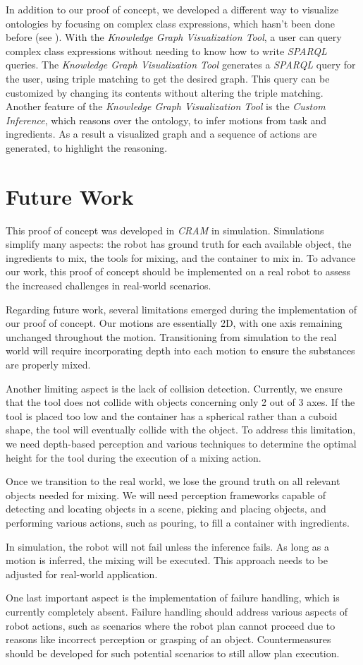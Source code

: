 In addition to our proof of concept, we developed a different way to visualize ontologies by focusing on complex class expressions, which hasn't been done before (see ). 
With the \textit{Knowledge Graph Visualization Tool}, a user can query complex class expressions without needing to know how to write \textit{SPARQL} queries. 
The \textit{Knowledge Graph Visualization Tool} generates a \textit{SPARQL} query for the user, using triple matching to get the desired graph. 
This query can be customized by changing its contents without altering the triple matching. Another feature of the \textit{Knowledge Graph Visualization Tool}
is the \textit{Custom Inference}, which reasons over the  ontology, to infer motions from task and ingredients. As a result a visualized graph 
and a sequence of actions are generated, to highlight the reasoning.  

\section{Future Work}
This proof of concept was developed in \textit{CRAM} \cite{beetz10cram} in simulation. Simulations simplify many aspects: the robot has ground truth for each available object, the ingredients to mix, the tools for mixing, and the container to mix in. To advance our work, this proof of concept should be implemented on a real robot to assess the increased challenges in real-world scenarios.

Regarding future work, several limitations emerged during the implementation of our proof of concept. Our motions are essentially 2D, with one axis remaining unchanged throughout the motion. Transitioning from simulation to the real world will require incorporating depth into each motion to ensure the substances are properly mixed.

Another limiting aspect is the lack of collision detection. Currently, we ensure that the tool does not collide with objects concerning only 2 out of 3 axes. If the tool is placed too low and the container has a spherical rather than a cuboid shape, the tool will eventually collide with the object. To address this limitation, we need depth-based perception and various techniques to determine the optimal height for the tool during the execution of a mixing action.

Once we transition to the real world, we lose the ground truth on all relevant objects needed for mixing. We will need perception frameworks capable of detecting and locating objects in a scene, picking and placing objects, and performing various actions, such as pouring, to fill a container with ingredients.

In simulation, the robot will not fail unless the inference fails. As long as a motion is inferred, the mixing will be executed. This approach needs to be adjusted for real-world application.

One last important aspect is the implementation of failure handling, which is currently completely absent. Failure handling should address various aspects of robot actions, such as scenarios where the robot plan cannot proceed due to reasons like incorrect perception or grasping of an object. Countermeasures should be developed for such potential scenarios to still allow plan execution.

